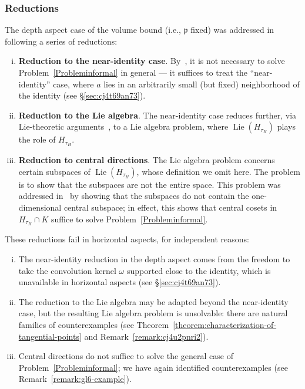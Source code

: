 \documentclass[reqno]{amsart}
\DeclareMathOperator{\Lie}{Lie}
\theoremstyle{plain} \newtheorem{theorem} {Theorem} \newtheorem{conjecture} {Conjecture} \newtheorem{corollary} [theorem] {Corollary} \newtheorem{proposition} [theorem] {Proposition} \newtheorem{fact} [theorem] {Fact}
\theoremstyle{definition} \newtheorem{definition} [theorem] {Definition}
\theoremstyle{itplain} %
\begin{document}
\subsubsection{Reductions}
The depth aspect case of the volume bound (i.e., $\mathfrak{p}$ fixed) was addressed in~\cite{2020arXiv201202187N} following a series of reductions:
\begin{enumerate}[(i)]
\item \textbf{Reduction to the near-identity case}. By~\cite[\S15]{2020arXiv201202187N}, it is not necessary to solve Problem~\ref{Probleminformal} in general --- it suffices to treat the ``near-identity'' case, where $a$ lies in an arbitrarily small (but fixed) neighborhood of the identity (see \S\ref{sec:cj4t69an73}).  
\item \textbf{Reduction to the Lie algebra}. The near-identity case reduces further, via Lie-theoretic arguments~\cite[\S16]{2020arXiv201202187N}, to a Lie algebra problem, where $\Lie(H_{\tau_H})$ plays the role of $H_{\tau_H}$.
\item \textbf{Reduction to central directions}. The Lie algebra problem concerns certain subspaces of $\Lie(H_{\tau_H})$, whose definition we omit here.  The problem is to show that the subspaces are not the entire space.  This problem was addressed in~\cite[\S17]{2020arXiv201202187N} by showing that the subspaces do not contain the one-dimensional central subspace; in effect, this shows that central cosets in $H_{\tau_H} \cap K$ suffice to solve Problem~\ref{Probleminformal}.
\end{enumerate}
These reductions fail in horizontal aspects, for independent reasons:
\begin{enumerate}[(i)]
\item The near-identity reduction in the depth aspect comes from the freedom to take the convolution kernel $\omega$ supported close to the identity, which is unavailable in horizontal aspects (see \S\ref{sec:cj4t69an73}).
\item The reduction to the Lie algebra may be adapted beyond the near-identity case, but the resulting Lie algebra problem is unsolvable: there are natural families of counterexamples (see Theorem~\ref{theorem:characterization-of-tangential-points} and Remark~\ref{remark:cj4u2pnri2}).
\item Central directions do not suffice to solve the general case of Problem~\ref{Probleminformal}; we have again identified counterexamples (see Remark~\ref{remark:gl6-example}).
\end{enumerate}
\end{document}
